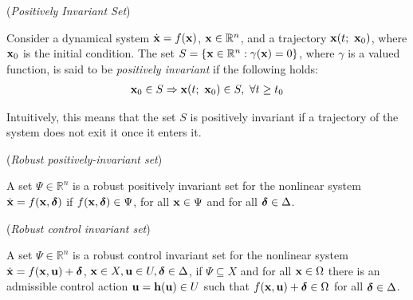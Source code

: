   \begin{definition} (\textit{Positively Invariant Set})
    \label{def:positively_invariant}

    Consider a dynamical system $\dot{\bm{\mathbf{x}}} = f(\bm{\mathbf{x}})$,
    $\bm{\mathbf{x}} \in \mathbb{R}^n$, and a trajectory $\bm{\mathbf{x}}(t;\ \bm{\mathbf{x}}_0)$,
    where $\bm{\mathbf{x}}_0$ is the initial condition. The set
    $S = \{\bm{\mathbf{x}} \in \mathbb{R}^n : \gamma(\bm{\mathbf{x}}) = 0\}$, where
    $\gamma$ is a valued function, is said to be \textit{positively invariant}
    if the following holds:
    \begin{align}
      \vect{x}_0 \in S \Rightarrow \vect{x}(t;\ \vect{x}_0) \in S,\ \forall t \geq t_0
    \end{align}

    Intuitively, this means that the set $S$ is positively invariant if a
    trajectory of the system does not exit it once it enters it. \\[2.5ex]
  \end{definition}


\begin{definition}\cite{ISS_SKATOLINI} (\textit{Robust positively-invariant set})
\label{def:robust_positively_invariant_set}

A set $\Psi \in \mathbb{R}^n$ is a robust positively invariant set for the
nonlinear system $\dot{\bm{\mathbf{x}}} = f(\bm{\mathbf{x}}, \bm{\mathbf{\delta}})$ if
$f(\bm{\mathbf{x}}, \bm{\mathbf{\delta}}) \in \Psi$, for all $\bm{\mathbf{x}} \in \Psi$ and for all
$\bm{\mathbf{\delta}} \in \Delta$.
\\[2.5ex]
\end{definition}


\begin{definition}\cite{1024831} (\textit{Robust control invariant set})
\label{def:robust_control_invariant_set}

A set $\Psi \in \mathbb{R}^n$ is a robust control invariant set for the
nonlinear system $\dot{\bm{\mathbf{x}}} = f(\bm{\mathbf{x}}, \bm{\mathbf{u}}) + \bm{\mathbf{\delta}}$,
$\bm{\mathbf{x}} \in X, \bm{\mathbf{u}} \in U, \bm{\mathbf{\delta}} \in \Delta$, if
$\Psi \subseteq X$ and for all $\bm{\mathbf{x}} \in \Omega$ there is an admissible
control action $\bm{\mathbf{u}} = \bm{\mathbf{h}}(\bm{\mathbf{u}}) \in U$ such that
$f(\bm{\mathbf{x}}, \bm{\mathbf{u}}) + \bm{\mathbf{\delta}} \in \Omega$ for all
$\bm{\mathbf{\delta}} \in \Delta$.
\\[2.5ex]
\end{definition}
